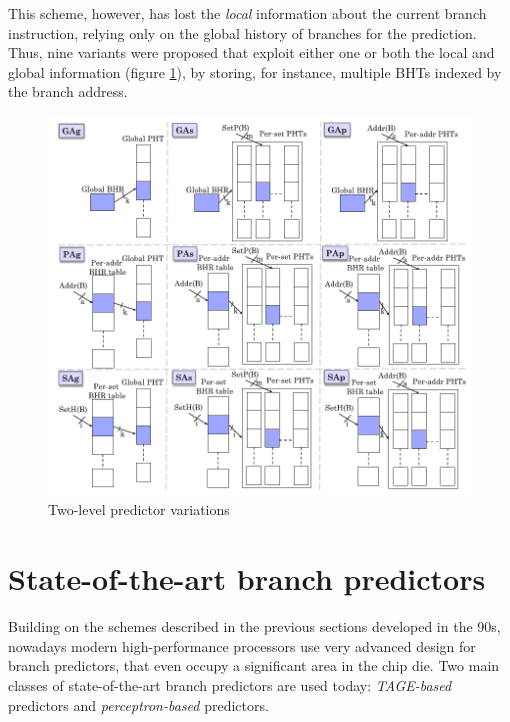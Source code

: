 This scheme, however, has lost the \emph{local} information about the current branch instruction, relying only on the global history of branches for the prediction. Thus, nine variants were proposed \cite{yeh93} that exploit either one or both the local and global information (figure \ref{fig:yehvariations}), by storing, for instance, multiple \acp{BHT} indexed by the branch address.

\begin{figure}[hbtp]
  \centering
  \includegraphics[width=\textwidth]{img/yehvariations.pdf}
  \caption{Two-level predictor variations \cite{mittal19}}
  \label{fig:yehvariations}
\end{figure}

\section{State-of-the-art branch predictors}
Building on the schemes described in the previous sections developed in the 90s, nowadays modern high-performance processors use very advanced design for branch predictors, that even occupy a significant area in the chip die. Two main classes of state-of-the-art branch predictors are used today: \emph{\acs{TAGE}-based} predictors and \emph{perceptron-based} predictors.

